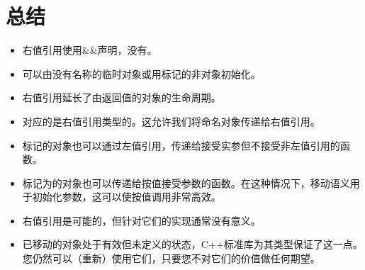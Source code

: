 \section{总结}
\begin{itemize}
	\item 右值引用使用\&\&声明，没有。
	\item 可以由没有名称的临时对象或用标记的非对象初始化。
	\item 右值引用延长了由返回值的对象的生命周期。
	\item {}对应的是右值引用类型的。这允许我们将命名对象传递给右值引用。
	\item {}标记的对象也可以通过左值引用，传递给接受实参但不接受非左值引用的函数。
	\item 标记为的对象也可以传递给按值接受参数的函数。在这种情况下，移动语义用于初始化参数，这可以使按值调用非常高效。
	\item {}右值引用是可能的，但针对它们的实现通常没有意义。
	\item 已移动的对象处于有效但未定义的状态，C++标准库为其类型保证了这一点。您仍然可以（重新）使用它们，只要您不对它们的价值做任何期望。
\end{itemize}


